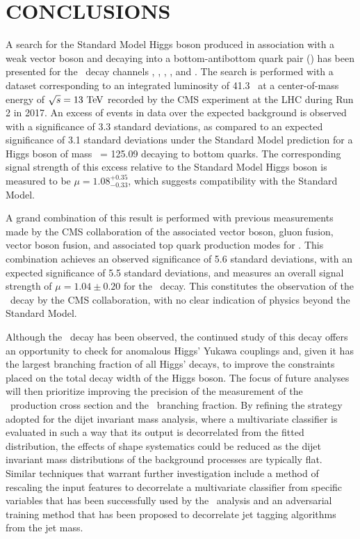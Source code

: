 \chapter{CONCLUSIONS} \label{conclusions}

A search for the Standard Model Higgs boson produced in association with a weak vector boson and decaying into a bottom-antibottom quark pair (\bb) has been presented for the \VHbb\ decay channels \ZnnHbb, \WenHbb, \WmnHbb, \ZeeHbb, and \ZmmHbb. The search is performed with a dataset corresponding to an integrated luminosity of 41.3 \invfb\ at a center-of-mass energy of $\sqrt{s} = 13\ \mathrm{TeV}$ recorded by the CMS experiment at the LHC during Run 2 in 2017. An excess of events in data over the expected background is observed with a significance of 3.3 standard deviations, as compared to an expected significance of 3.1 standard deviations under the Standard Model prediction for a Higgs boson of mass \massH\ = 125.09 \GeV decaying to bottom quarks. The corresponding signal strength of this excess relative to the Standard Model Higgs boson is measured to be $\mu = 1.08_{-0.33}^{+0.35}$, which suggests compatibility with the Standard Model.

A grand combination of this result is performed with previous measurements made by the CMS collaboration of the associated vector boson, gluon fusion, vector boson fusion, and associated top quark production modes for \Htobb. This combination achieves an observed significance of 5.6 standard deviations, with an expected significance of 5.5 standard deviations, and measures an overall signal strength of $\mu = 1.04 \pm 0.20$ for the \Htobb\ decay. This constitutes the observation of the \Htobb\ decay by the CMS collaboration, with no clear indication of physics beyond the Standard Model.

Although the \Htobb\ decay has been observed, the continued study of this decay offers an opportunity to check for anomalous Higgs' Yukawa couplings and, given it has the largest branching fraction of all Higgs' decays, to improve the constraints placed on the total decay width of the Higgs boson. The focus of future analyses will then prioritize improving the precision of the measurement of the \VHbb\ production cross section and the \Htobb\ branching fraction. By refining the strategy adopted for the dijet invariant mass analysis, where a multivariate classifier is evaluated in such a way that its output is decorrelated from the fitted distribution, the effects of shape systematics could be reduced as the dijet invariant mass distributions of the background processes are typically flat. Similar techniques that warrant further investigation include a method of rescaling the input features to decorrelate a multivariate classifier from specific variables that has been successfully used by the \Htomm\ analysis\cite{HTOMUMU} and an adversarial training method that has been proposed to decorrelate jet tagging algorithms from the jet mass\cite{ADVTRAIN}.

